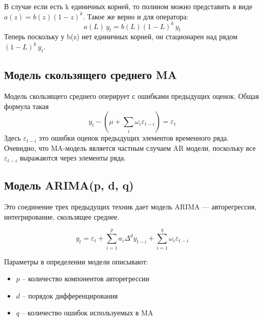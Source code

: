 \documentclass[../handbook.tex]{subfiles}
\begin{document}
В случае если есть k единичных корней, то полином можно представить в виде $a(z) = b(z) (1-z)^k$. Такое же верно и для оператора:
\begin{equation}
    a(L)\, y_t = b(L) (1 - L)^k \, y_t
\end{equation}
Теперь поскольку у b(z) нет единичных корней, он стационарен над рядом $(1-L)^k \, y_t$.

\subsection{Модель скользящего среднего MA}
Модель скользящего среднего оперирует с ошибками предыдущих оценок. Общая формула такая
\begin{equation}
    \label{eq:ts:MA}
    y_t - (\mu + \sum_i \omega_i\varepsilon_{t-i}) = \varepsilon_t
\end{equation}
Здесь $\varepsilon_{t-i}$ это ошибки оценок предыдущих элементов временного ряда. Очевидно, что MA-модель является частным случаем AR модели, поскольку все~$\varepsilon_{t-i}$ выражаются через элементы ряда.

\subsection{Модель ARIMA(p, d, q)}
Это соединение трех предыдущих техник дает модель ARIMA --- авторегрессия, интегрирование, скользящее среднее.

\begin{equation}
    \label{eq:ts:ARIMA}
    y_t = \varepsilon_t + \sum_{i=1}^p a_i \Delta^d y_{t-i} + \sum_{i=1}^q\omega_i\varepsilon_{t-i}
\end{equation}

Параметры в определении модели описывают:
\begin{itemize}
    \item $p$ -- количество компонентов авторегрессии
    \item $d$ -- порядок дифференцирования
    \item $q$ -- количество ошибок используемых в MA
\end{itemize}
\end{document}
